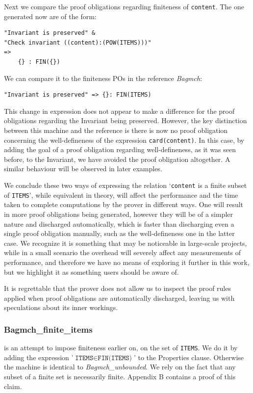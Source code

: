 \documentclass[12pt,journal,duplex]{IEEEtran}
\begin{document}
	Next we compare the proof obligations regarding finiteness of \texttt{content}. The one generated now are of the form:

\begin{lstlisting}
"Invariant is preserved" &
"Check invariant ((content):(POW(ITEMS)))"
=>
	{} : FIN({})
\end{lstlisting}

	We can compare it to the finiteness POs in the reference \emph{Bagmch}:

	\begin{lstlisting}
"Invariant is preserved" => {}: FIN(ITEMS)
	\end{lstlisting}

	This change in expression does not appear to make a difference for the proof obligations regarding the Invariant being preserved. However, the key distinction between this machine and the reference is there is now no proof obligation concerning the well-defineness of the expression \texttt{card(content)}. In this case, by adding the goal of a proof obligation regarding well-defineness, as it was seen before, to the Invariant, we have avoided the proof obligation altogether. A similar behaviour will be observed in later examples.

	We conclude these two ways of expressing the relation `\texttt{content} is a finite subset of \texttt{ITEMS}', while equivalent in theory, will affect the performance and the time taken to complete computations by the prover in different ways. One will result in more proof obligations being generated, however they will be of a simpler nature and discharged automatically, which is faster than discharging even a single proof obligation manually, such as the well-defineness one in the latter case. We recognize it is something that may be noticeable in large-scale projects, while in a small scenario the overhead will severely affect any measurements of performance, and therefore we have no means of exploring it further in this work, but we highlight it as something users should be aware of.

	It is regrettable that the prover does not allow us to inspect the proof rules applied when proof obligations are automatically discharged, leaving us with speculations about its inner workings.

	\subsubsection{Bagmch\_finite\_items} is an attempt to impose finiteness earlier on, on the set of \texttt{ITEMS}. We do it by adding the expression '$\texttt{ITEMS} \in \texttt{FIN(ITEMS)}$' to the Properties clause. Otherwise the machine is identical to \emph{Bagmch\_unbounded}. We rely on the fact that any subset of a finite set is necessarily finite. Appendix B contains a proof of this claim.
\end{document}

